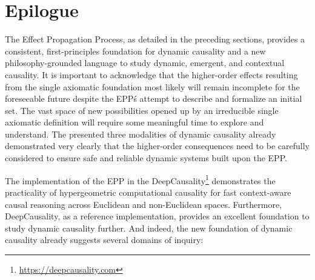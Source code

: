 \section{Epilogue}
\label{sec:epilogue}

 The Effect Propagation Process, as detailed in the preceding sections, provides a consistent, first-principles foundation for dynamic causality and a new philosophy-grounded language to study dynamic, emergent, and contextual causality. It is important to acknowledge that the higher-order effects resulting from the single axiomatic foundation most likely will remain incomplete for the foreseeable future despite the EPP\'s attempt to describe and formalize an initial set. The vast space of new possibilities opened up by  an irreducible single axiomatic definition will require some meaningful time to explore and understand. The presented three modalities of dynamic causality already demonstrated very clearly that the higher-order consequences need to be carefully considered to ensure safe and reliable dynamic systems built upon the EPP. 

The implementation of the EPP in the DeepCausality\footnote{\url{https://deepcausality.com}} demonstrates the practicality of hypergeometric computational causality for fast context-aware causal reasoning across Euclidean and non-Euclidean spaces. Furthermore, DeepCausality, as a reference implementation, provides an excellent foundation to study dynamic causality further. And indeed, the new foundation of dynamic causality already suggests  several domains of inquiry: 

